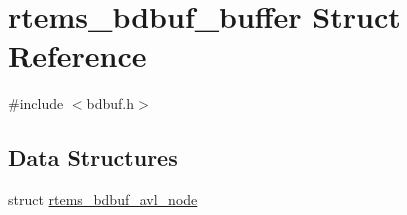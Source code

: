 \hypertarget{structrtems__bdbuf__buffer}{}\section{rtems\+\_\+bdbuf\+\_\+buffer Struct Reference}
\label{structrtems__bdbuf__buffer}


{\ttfamily \#include $<$bdbuf.\+h$>$}

\subsection*{Data Structures}
\begin{DoxyCompactItemize}
\item 
struct \mbox{\hyperlink{structrtems__bdbuf__buffer_1_1rtems__bdbuf__avl__node}{rtems\+\_\+bdbuf\+\_\+avl\+\_\+node}}
\end{DoxyCompactItemize}
